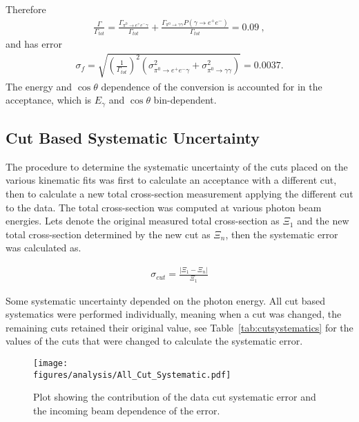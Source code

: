  	Therefore
 	\begin{align}
 		\frac{\Gamma}{\Gamma_{tot}} = \frac{\Gamma_{\pi^{0}\rightarrow e^{+}e^{-}\gamma}}{\Gamma_{tot}} + \frac{\Gamma_{\pi^{0}\rightarrow \gamma \gamma}P(\gamma \to  e^{+}e^{-})}{\Gamma_{tot}} = 0.09 \ ,
 	\end{align}
 	and has error
 	\begin{align}
 		\sigma_f = \sqrt{\left(\frac{1}{\Gamma_{tot}}\right)^2(\sigma^2_{\pi^{0}\rightarrow e^{+}e^{-}\gamma} + \sigma^2_{\pi^{0}\rightarrow \gamma \gamma})  } = 0.0037.  
 	\end{align}
 	The energy and $\cos \theta$ dependence of the conversion is accounted for in the acceptance, which is $E_\gamma$ and $\cos \theta$ bin-dependent. 
 	
 	
 	\FloatBarrier
 	
 	\subsection{Cut Based Systematic Uncertainty}
 	The procedure to determine the systematic uncertainty of the cuts placed on the various kinematic fits was first to calculate an acceptance with a different cut, then to calculate a new total cross-section measurement applying the different cut to the data. The total cross-section was computed at various photon beam energies. Lets denote the original measured total cross-section as $\Xi_1$ and the new total cross-section determined by the new cut as $\Xi_n$, then the systematic error was calculated as.
 	
 	\begin{align}
 		\sigma_{cut} = \frac{\left| \Xi_1 - \Xi_n \right|}{\Xi_1}
 	\end{align}
 	
 	Some systematic uncertainty depended on the photon energy. All cut based systematics were performed individually, meaning when a cut was changed, the remaining cuts retained their original value, see Table~\ref{tab:cutsystematics} for the values of the cuts that were changed to calculate the systematic error.
 	
 	
 	\begin{figure}[h!]\begin{center}
 			\texttt{[image: \\figures/analysis/All\_Cut\_Systematic.pdf]}
 			\caption[Plot showing the contribution of the data cut systematic error and the incoming beam dependence of the error]{\label{fig:sys_cut_error} Plot showing the contribution of the data cut systematic error and the incoming beam dependence of the error.}
 		\end{center}\end{figure}
 		\FloatBarrier
